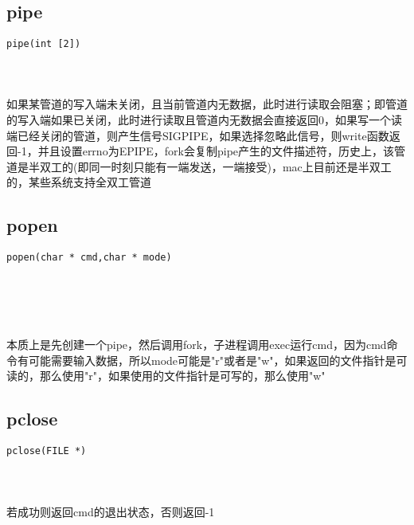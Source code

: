 \documentclass[10pt,a4paper]{article}
\begin{document}
\section{\color[rgb]{0.2,0.4,0.6}{管道}}
\subsection{pipe}
\begin{spacing}{2.0}
\lstset{language=C,numbers=none}
\begin{lstlisting}
pipe(int [2])
\end{lstlisting}
{\large\color[rgb]{0.2,0.4,0.6}{[2]:}}
\paragraph{ \ \ }如果某管道的写入端未关闭，且当前管道内无数据，此时进行读取会阻塞；即管道的写入端如果已关闭，此时进行读取且管道内无数据会直接返回0，如果写一个读端已经关闭的管道，则产生信号SIGPIPE，如果选择忽略此信号，则write函数返回-1，并且设置errno为EPIPE，fork会复制pipe产生的文件描述符，历史上，该管道是半双工的(即同一时刻只能有一端发送，一端接受)，mac上目前还是半双工的，某些系统支持全双工管道
\end{spacing}

\subsection{popen}
\begin{spacing}{2.0}
\lstset{language=C,numbers=none}
\begin{lstlisting}
popen(char * cmd,char * mode)
\end{lstlisting}
{\large\color[rgb]{0.2,0.4,0.6}{cmd:}} \\
{\large\color[rgb]{0.2,0.4,0.6}{mode:}}
\paragraph{ \ \ }本质上是先创建一个pipe，然后调用fork，子进程调用exec运行cmd，因为cmd命令有可能需要输入数据，所以mode可能是"r"或者是"w"，如果返回的文件指针是可读的，那么使用"r"，如果使用的文件指针是可写的，那么使用"w"
\end{spacing}

\subsection{pclose}
\begin{spacing}{2.0}
\lstset{language=C,numbers=none}
\begin{lstlisting}
pclose(FILE *)
\end{lstlisting}
{\large\color[rgb]{0.2,0.4,0.6}{*:}}
\paragraph{ \ \ }若成功则返回cmd的退出状态，否则返回-1
\end{spacing}
\end{document}
